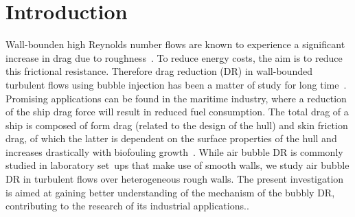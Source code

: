 \documentclass[aps,twocolumn,10pt,floatfix, superscriptaddress,longbibliography,pra]{revtex4-1}
\begin{document}

\clearpage
\section{Introduction}
Wall-bounden high Reynolds number flows are known to experience a significant increase in drag due to roughness~\citep{Jimenez2004,Marusic2010,Flack2010,Flack2014}. To reduce energy costs, the aim is to reduce this frictional resistance. Therefore drag reduction (DR) in wall-bounded turbulent flows using bubble injection has been a matter of study for long time~\citep{Ceccio2010,Murai2014,Verschoof2018}. Promising applications can be found in the maritime industry, where a reduction of the ship drag force will result in reduced fuel consumption. The total drag of a ship is composed of form drag (related to the design of the hull) and skin friction drag, of which the latter is dependent on the surface properties of the hull and increases drastically with biofouling growth~\citep{Jimenez2004,Schultz2007,Flack2010,Flack2014}. While air bubble DR is commonly studied in laboratory set~ups that make use of smooth walls, we study air bubble DR in turbulent flows over heterogeneous rough walls. The present investigation is aimed at gaining better understanding of the mechanism of the bubbly DR, contributing to the research of its industrial applications..
\end{document}
